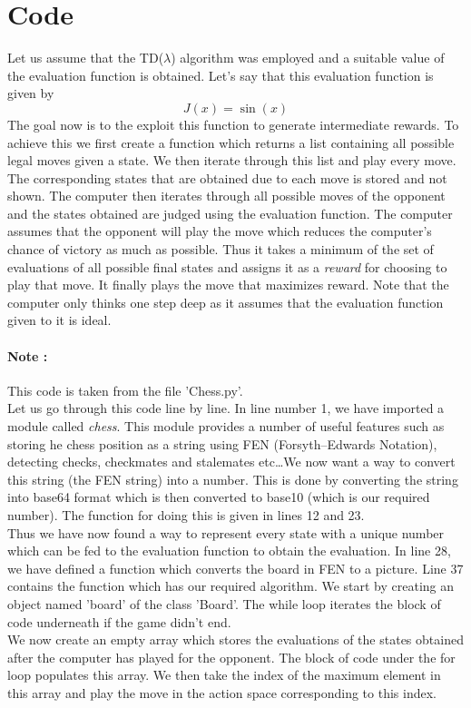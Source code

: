 \documentclass[11pt]{article}
\begin{document}
\section{Code}
Let us assume that the TD($\lambda$) algorithm was employed and a suitable value of the evaluation function is obtained. Let's say that this evaluation function is given by 
\[
    J(x) = \sin(x)
\]
The goal now is to the exploit this function to generate intermediate rewards. To achieve this we first create a function which returns a list containing all possible legal moves given a state. We then iterate through this list and play every move. The corresponding states that are obtained due to each move is stored and not shown. The computer then iterates through all possible moves of the opponent and the states obtained are judged using the evaluation function. The computer assumes that the opponent will play the move which reduces the computer's chance of victory as much as possible. Thus it takes a minimum of the set of evaluations of all possible final states and assigns it as a \emph{reward} for choosing to play that move. It finally plays the move that maximizes reward. Note that the computer only thinks one step deep as it assumes that the evaluation function given to it is ideal.

\paragraph{Note : } 
This code is taken from the file 'Chess.py'. \\ 

\noindent Let us go through this code line by line. In line number 1, we have imported a module called \emph{chess}. This module provides a number of useful features such as storing he chess position as a string using FEN (Forsyth–Edwards Notation), detecting checks, checkmates and stalemates etc\dots We now want a way to convert this string (the FEN string) into a number. This is done by converting the string into base64 format which is then converted to base10 (which is our required number). The function for doing this is given in lines 12 and 23. \\ 

\noindent Thus we have now found a way to represent every state with a unique number which can be fed to the evaluation function to obtain the evaluation. In line 28, we have defined a function which converts the board in FEN to a picture. Line 37 contains the function which has our required algorithm. We start by creating an object named 'board' of the class 'Board'. The while loop iterates the block of code underneath if the game didn't end.  \\ 

\noindent We now create an empty array which stores the evaluations of the states obtained after the computer has played for the opponent. The block of code under the for loop populates this array. We then take the index of the maximum element in this array and play the move in the action space corresponding to this index. 
\end{document}
